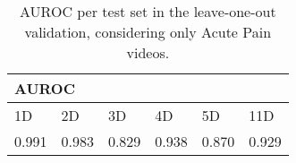 \begin{table}[h!tp]
\centering
\caption{AUROC per test set in the leave-one-out validation, considering only Acute Pain videos.}
\label{tab:auroc_leave_one_out}
\begin{tabular}{llllll}
\hline
\multicolumn{6}{l}{AUROC}                                                                                                                              \\ \hline
\multicolumn{1}{l|}{1D}    & \multicolumn{1}{l|}{2D}    & \multicolumn{1}{l|}{3D}    & \multicolumn{1}{l|}{4D}    & \multicolumn{1}{l|}{5D}    & 11D   \\ \hline
\multicolumn{1}{l|}{0.991} & \multicolumn{1}{l|}{0.983} & \multicolumn{1}{l|}{0.829} & \multicolumn{1}{l|}{0.938} & \multicolumn{1}{l|}{0.870} & 0.929 \\ \hline
\end{tabular}
\end{table}